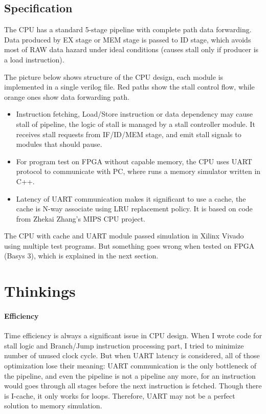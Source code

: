 \documentclass[12pt, a4paper]{article}
\theoremstyle{margin}
\begin{document}
\subsection{Specification}

The CPU has a standard 5-stage pipeline with complete path data forwarding. Data produced by EX stage or MEM stage is passed to ID stage, which avoids most of RAW data hazard under ideal conditions (causes stall only if producer is a load instruction).

The picture below shows structure of the CPU design, each module is implemented in a single verilog file. Red paths show the stall control flow, while orange ones show data forwarding path.

\begin{itemize}
	\item Instruction fetching, Load/Store instruction or data dependency may cause stall of pipeline, the logic of stall is managed by a stall controller module. It receives stall requests from IF/ID/MEM stage, and emit stall signals to modules that should pause.

	\item For program test on FPGA without capable memory, the CPU uses UART protocol to communicate with PC, where runs a memory simulator written in C++.

	\item Latency of UART communication makes it significant to use a cache, the cache is N-way associate using LRU replacement policy. It is based on code from Zhekai Zhang's MIPS CPU project.
\end{itemize}

The CPU with cache and UART module passed simulation in Xilinx Vivado using multiple test programs. But something goes wrong when tested on FPGA (Basys 3), which is explained in the next section.

\section{Thinkings}

\paragraph{Efficiency} Time efficiency is always a significant issue in CPU design. When I wrote code for stall logic and Branch/Jump instruction processing part, I tried to minimize number of unused clock cycle. But when UART latency is considered, all of those optimization lose their meaning: UART communication is the only bottleneck of the pipeline, and even the pipeline is not a pipeline any more, for an instruction would goes through all stages before the next instruction is fetched. Though there is I-cache, it only works for loops. Therefore, UART may not be a perfect solution to memory simulation.
\end{document}
